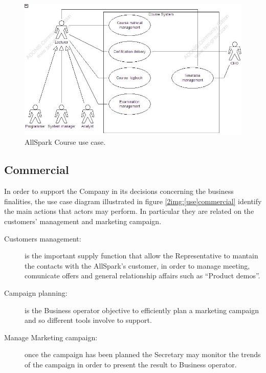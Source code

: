 \begin{figure}
\begin{centering}
\includegraphics[scale=0.45]{assign3/adonis/imgs/course.jpg}
\caption{AllSpark Course use case.}
\label{2img:[use]Course}
\end{centering}
\end{figure}


\subsection{Commercial}
In order to support the Company in its decisions concerning the business finalities, the use case diagram illustrated in figure \ref{2img:[use]commercial} identify the main actions that actors may perform. In particular they are related on the customers' management and marketing campaign.
\begin{description}
 \item[Customers management:] is the important supply function that allow the Representative to mantain the contacts with the AllSpark's customer, in order to manage meeting, comunicate offers and general relationship affairs such as ``Product demos''.
 \item[Campaign planning:] is the Business operator objective to efficiently plan a marketing campaign and so different tools involve to support.
 \item[Manage Marketing campaign:] once the campaign has been planned the Secretary may monitor the trends of the campaign in order to present the result to Business operator.
\end{description}

